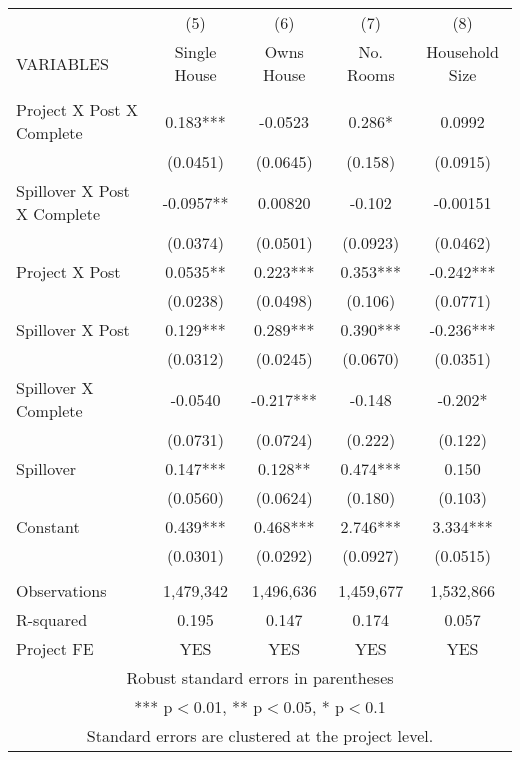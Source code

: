 
\begin{tabular}{lcccc} \hline
 & (5) & (6) & (7) & (8) \\
VARIABLES  & Single House & Owns House & No. Rooms & Household Size \\ \hline
   &  &  &  &  \\
Project X Post X Complete  & 0.183*** & -0.0523 & 0.286* & 0.0992 \\
  & (0.0451) & (0.0645) & (0.158) & (0.0915) \\
 Spillover X Post X Complete  & -0.0957** & 0.00820 & -0.102 & -0.00151 \\
 & (0.0374) & (0.0501) & (0.0923) & (0.0462) \\
Project X Post & 0.0535** & 0.223*** & 0.353*** & -0.242*** \\
  & (0.0238) & (0.0498) & (0.106) & (0.0771) \\
Spillover X Post  & 0.129*** & 0.289*** & 0.390*** & -0.236*** \\
  & (0.0312) & (0.0245) & (0.0670) & (0.0351) \\
Spillover X Complete  & -0.0540 & -0.217*** & -0.148 & -0.202* \\
  & (0.0731) & (0.0724) & (0.222) & (0.122) \\
Spillover & 0.147*** & 0.128** & 0.474*** & 0.150 \\
  & (0.0560) & (0.0624) & (0.180) & (0.103) \\
Constant  & 0.439*** & 0.468*** & 2.746*** & 3.334*** \\
  & (0.0301) & (0.0292) & (0.0927) & (0.0515) \\
   &  &  &  &  \\
Observations  & 1,479,342 & 1,496,636 & 1,459,677 & 1,532,866 \\
R-squared  & 0.195 & 0.147 & 0.174 & 0.057 \\
 Project FE & YES & YES & YES & YES \\ \hline
\multicolumn{5}{c}{ Robust standard errors in parentheses} \\
\multicolumn{5}{c}{ *** p$<$0.01, ** p$<$0.05, * p$<$0.1} \\
\multicolumn{5}{c}{ Standard errors are clustered at the project level.} \\
\end{tabular}
